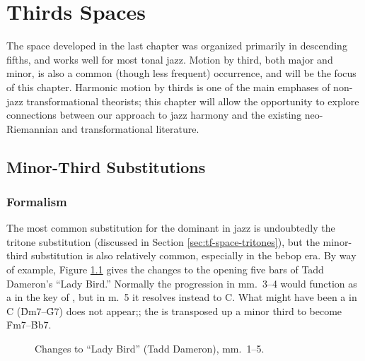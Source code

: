 
\chapter{Thirds Spaces}
\label{chap:thirds-spaces}
\addtocspace

The space developed in the last chapter was organized primarily in descending
fifths, and works well for most tonal jazz. Motion by third, both major and
minor, is also a common (though less frequent) occurrence, and will be the
focus of this chapter. Harmonic motion by thirds is one of the main
emphases of non-jazz transformational theorists; this chapter will allow the
opportunity to explore connections between our approach to jazz harmony and
the existing neo-Riemannian and transformational literature.

\section{Minor-Third Substitutions}
\label{sec:minor-third-subst}

\subsection{Formalism}
\label{sec:m3-formalism}

The most common substitution for the dominant in jazz is undoubtedly the
tritone substitution (discussed in Section \ref{sec:tf-space-tritones}), but
the minor-third substitution is also relatively common, especially in the
bebop era. By way of example, Figure \ref{mts:ladybird-changes} gives the
changes to the opening five bars of Tadd Dameron's ``Lady Bird.'' Normally the
progression in mm.~3--4 would function as a \tf in the key of \Eflat, but in
m.~5 it resolves instead to C. What might have been a \tfo in C
(\h{Dm7}--\h{G7}) does not appear;; the \tf is transposed up a minor third to
become \h{Fm7}--\h{Bb7}.

\begin{figure}[tbp]
  \caption{Changes to ``Lady Bird'' (Tadd Dameron), mm.~1--5.}
  \label{mts:ladybird-changes}
\end{figure}

